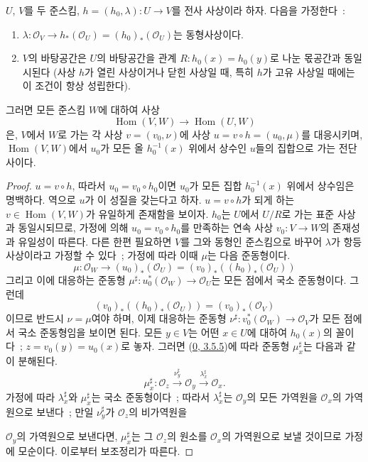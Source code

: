 \begin{lemma}[8.11.1]
\label{II.8.11.1-ko}
$U$, $V$를 두 준스킴, $h=(h_0,\lambda):U\to V$를 전사 사상이라 하자.
다음을 가정한다~:
\begin{enumerate}
  \item[$1^\circ$]
  $\lambda:\mathcal{O}_V\to h_*(\mathcal{O}_U)
  =(h_0)_*(\mathcal{O}_U)$는 동형사상이다.
  \item[$2^\circ$] $V$의 바탕공간은 $U$의 바탕공간을 관계
  $R:h_0(x)=h_0(y)$로 나눈 몫공간과 동일시된다 (사상 $h$가 열린
  사상이거나 닫힌 사상일 때, 특히 $h$가 고유 사상일 때에는 이 조건이
  항상 성립한다).
\end{enumerate}
그러면 모든 준스킴 $W$에 대하여 사상
\begin{equation}
\label{II.8.11.1.1-ko}
  \operatorname{Hom}(V,W)\longrightarrow\operatorname{Hom}(U,W)
\tag{8.11.1.1}
\end{equation}
은, $V$에서 $W$로 가는 각 사상 $v=(v_0,\nu)$에 사상
$u=v\circ h=(u_0,\mu)$를 대응시키며, $\operatorname{Hom}(V,W)$에서
$u_0$가 모든 올 $h_0^{-1}(x)$ 위에서 상수인 $u$들의 집합으로 가는
전단사이다.
\end{lemma}

\begin{proof}
$u=v\circ h$, 따라서 $u_0=v_0\circ h_0$이면 $u_0$가 모든 집합
$h_0^{-1}(x)$ 위에서 상수임은 명백하다. 역으로 $u$가 이 성질을
갖는다고 하자. $u=v\circ h$가 되게 하는
$v\in\operatorname{Hom}(V,W)$가 유일하게 존재함을 보이자. $h_0$는
$U$에서 $U/R$로 가는 표준 사상과 동일시되므로, 가정에 의해
$u_0=v_0\circ h_0$를 만족하는 연속 사상 $v_0:V\to W$의 존재성과
유일성이 따른다. 다른 한편 필요하면 $V$를 그와 동형인 준스킴으로
바꾸어 $\lambda$가 항등사상이라고 가정할 수 있다~; 가정에 따라 이때
$\mu$는 다음 준동형이다.
\[
  \mu:\mathcal{O}_W\longrightarrow(u_0)_*(\mathcal{O}_U)
  =(v_0)_*((h_0)_*(\mathcal{O}_U))
\]
그리고 이에 대응하는 준동형
$\mu^\sharp:u_0^*(\mathcal{O}_W)\to\mathcal{O}_U$는 모든 점에서 국소
준동형이다. 그런데
\[
  (v_0)_*((h_0)_*(\mathcal{O}_U))=(v_0)_*(\mathcal{O}_V)
\]
이므로 반드시
$\nu=\mu$여야 하며, 이제 대응하는 준동형
$\nu^\sharp:v_0^*(\mathcal{O}_W)\to\mathcal{O}_V$가 모든 점에서 국소
준동형임을 보이면 된다. 모든 $y\in V$는 어떤 $x\in U$에 대하여
$h_0(x)$의 꼴이다~; $z=v_0(y)=u_0(x)$로 놓자. 그러면
(\hyperref[0.3.5.5-ko]{0, 3.5.5})에 따라 준동형 $\mu_x^\sharp$는 다음과
같이 분해된다.
\[
  \mu_x^\sharp:\mathcal{O}_z
  \xrightarrow{\nu_y^\sharp}\mathcal{O}_y
  \xrightarrow{\lambda_x^\sharp}\mathcal{O}_x.
\]
가정에 따라 $\lambda_x^\sharp$와 $\mu_x^\sharp$는 국소 준동형이다~;
따라서 $\lambda_x^\sharp$는 $\mathcal{O}_y$의 모든 가역원을
$\mathcal{O}_x$의 가역원으로 보낸다~; 만일 $\nu_y^\sharp$가
$\mathcal{O}_z$의 비가역원을

$\mathcal{O}_y$의 가역원으로 보낸다면, $\mu_x^\sharp$는 그
$\mathcal{O}_z$의 원소를 $\mathcal{O}_x$의 가역원으로 보낼 것이므로
가정에 모순이다. 이로부터 보조정리가 따른다.
\end{proof}

